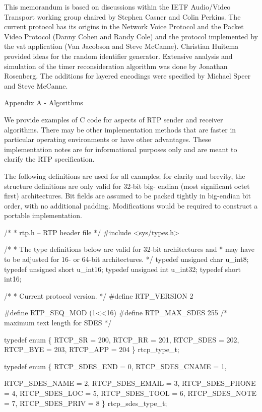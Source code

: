 \documentclass{article}
\begin{document}
This memorandum is based on discussions within the IETF Audio/Video Transport working group chaired by Stephen Casner and Colin Perkins. The current protocol has its origins in the Network Voice Protocol and the Packet Video Protocol (Danny Cohen and Randy Cole) and the protocol implemented by the vat application (Van Jacobson and Steve McCanne).  Christian Huitema provided ideas for the random identifier generator.  Extensive analysis and simulation of the timer reconsideration algorithm was done by Jonathan Rosenberg.  The additions for layered encodings were specified by Michael Speer and Steve McCanne.

Appendix A - Algorithms

We provide examples of C code for aspects of RTP sender and receiver algorithms.  There may be other implementation methods that are faster in particular operating environments or have other advantages. These implementation notes are for informational purposes only and are meant to clarify the RTP specification.

The following definitions are used for all examples; for clarity and brevity, the structure definitions are only valid for 32-bit big- endian (most significant octet first) architectures.  Bit fields are assumed to be packed tightly in big-endian bit order, with no additional padding.  Modifications would be required to construct a portable implementation.

/* * rtp.h  --  RTP header file */ \#include <sys/types.h>

/* * The type definitions below are valid for 32-bit architectures and * may have to be adjusted for 16- or 64-bit architectures. */ typedef unsigned char  u\_int8; typedef unsigned short u\_int16; typedef unsigned int   u\_int32; typedef          short int16;

/* * Current protocol version. */ \#define RTP\_VERSION    2

\#define RTP\_SEQ\_MOD (1<<16) \#define RTP\_MAX\_SDES 255      /* maximum text length for SDES */

typedef enum \{ RTCP\_SR   = 200, RTCP\_RR   = 201, RTCP\_SDES = 202, RTCP\_BYE  = 203, RTCP\_APP  = 204 \} rtcp\_type\_t;

typedef enum \{ RTCP\_SDES\_END   = 0, RTCP\_SDES\_CNAME = 1,

RTCP\_SDES\_NAME  = 2, RTCP\_SDES\_EMAIL = 3, RTCP\_SDES\_PHONE = 4, RTCP\_SDES\_LOC   = 5, RTCP\_SDES\_TOOL  = 6, RTCP\_SDES\_NOTE  = 7, RTCP\_SDES\_PRIV  = 8 \} rtcp\_sdes\_type\_t;
\end{document}
